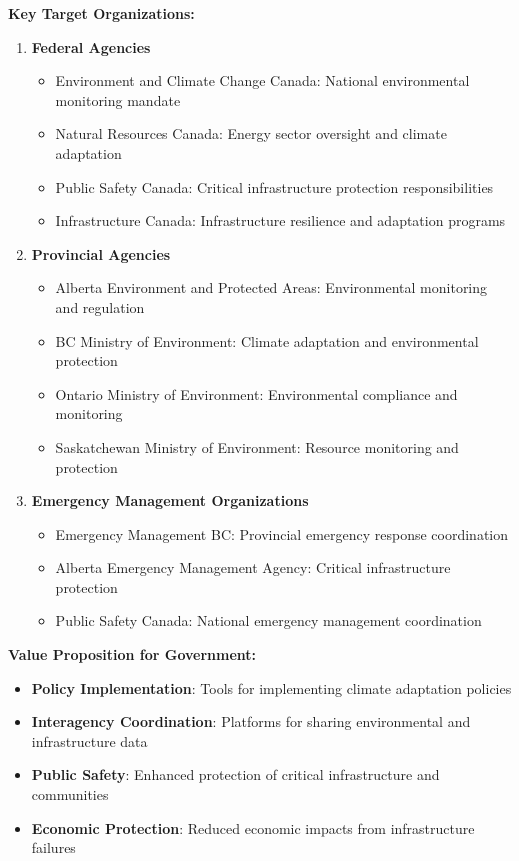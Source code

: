 \textbf{Key Target Organizations:}
\begin{enumerate}
    \item \textbf{Federal Agencies}
    \begin{itemize}
        \item Environment and Climate Change Canada: National environmental monitoring mandate
        \item Natural Resources Canada: Energy sector oversight and climate adaptation
        \item Public Safety Canada: Critical infrastructure protection responsibilities
        \item Infrastructure Canada: Infrastructure resilience and adaptation programs
    \end{itemize}
    
    \item \textbf{Provincial Agencies}
    \begin{itemize}
        \item Alberta Environment and Protected Areas: Environmental monitoring and regulation
        \item BC Ministry of Environment: Climate adaptation and environmental protection
        \item Ontario Ministry of Environment: Environmental compliance and monitoring
        \item Saskatchewan Ministry of Environment: Resource monitoring and protection
    \end{itemize}
    
    \item \textbf{Emergency Management Organizations}
    \begin{itemize}
        \item Emergency Management BC: Provincial emergency response coordination
        \item Alberta Emergency Management Agency: Critical infrastructure protection
        \item Public Safety Canada: National emergency management coordination
    \end{itemize}
\end{enumerate}

\textbf{Value Proposition for Government:}
\begin{itemize}
    \item \textbf{Policy Implementation}: Tools for implementing climate adaptation policies
    \item \textbf{Interagency Coordination}: Platforms for sharing environmental and infrastructure data
    \item \textbf{Public Safety}: Enhanced protection of critical infrastructure and communities
    \item \textbf{Economic Protection}: Reduced economic impacts from infrastructure failures
\end{itemize}

